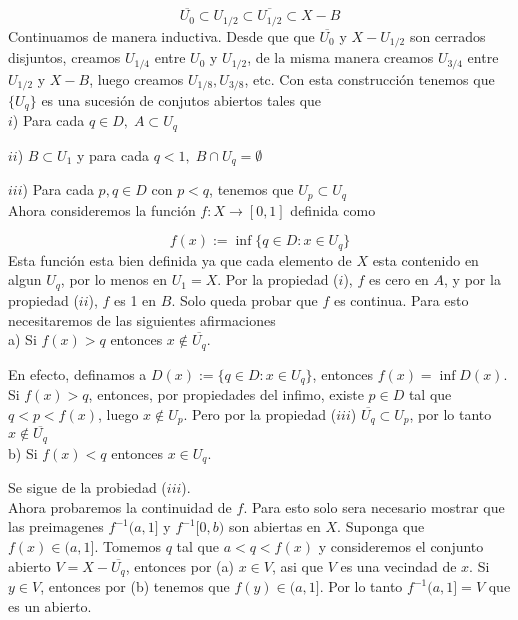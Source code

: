 \documentclass[12pt]{article}
\begin{document}
    \[\overline{U_0} \subset U_{1/2} \subset \overline{U_{1/2}} \subset X-B\]
    Continuamos de manera inductiva. Desde que que $\overline{U_0}$ y $X-U_{1/2}$ son 
    cerrados disjuntos, creamos $U_{1/4}$ entre $U_0$ y $U_{1/2}$, de la misma manera 
    creamos $U_{3/4}$ entre $U_{1/2}$ y $X-B$, luego creamos $U_{1/8}, U_{3/8}$, etc.
    Con esta construcci\'on tenemos que $\{U_q\}$ es una sucesi\'on de conjutos abiertos 
    tales que 
    \\

    $i$) \hspace*{4pt} Para cada $q\in D,\; A\subset U_q$

    $ii$) \hspace*{1pt} $B\subset U_1$ y para cada $q < 1,\; B\cap U_q = \emptyset$

    $iii$) Para cada $p,q\in D$ con $p < q$, tenemos que $U_p \subset U_q$
    \\

    Ahora consideremos la funci\'on $f:X\rightarrow [0,1]$ definida como

    \[f(x) := \inf\{q\in D : x\in U_q\}\]
    Esta funci\'on esta bien definida ya que cada elemento de $X$ esta contenido en algun 
    $U_q$, por lo menos en $U_1 = X$. Por la propiedad ($i$), $f$ es cero en $A$, y por 
    la propiedad ($ii$), $f$ es 1 en $B$. Solo queda probar que $f$ es continua. Para esto
    necesitaremos de las siguientes afirmaciones
    \\

    a) Si $f(x) > q$ entonces $x \notin \overline{U_q}$.
    
    \hspace*{8pt} En efecto, definamos a $D(x) := \{q\in D : x\in U_q\}$, entonces $f(x) = \inf D(x)$.
    Si \hspace*{26pt} $f(x) > q$, entonces, por propiedades del infimo, existe $p\in D$ tal que 
    $q < p < f(x)$, \hspace*{27pt} luego $x\notin U_p$. Pero por la propiedad ($iii$) 
    $\overline{U_q}\subset U_p$, por lo tanto $x\notin \overline{U_q}$
    \\

    b) Si $f(x) < q$ entonces $x\in U_q$.

    \hspace*{10pt} Se sigue de la probiedad ($iii$).
    \\

    Ahora probaremos la continuidad de $f$. Para esto solo sera necesario mostrar que las 
    preimagenes $f^{-1}(a,1]$ y $f^{-1}[0,b)$ son abiertas en $X$. Suponga que 
    $f(x)\in (a,1]$. Tomemos $q$ tal que $a < q < f(x)$ y consideremos el conjunto abierto
    $V = X-\overline{U_q}$, entonces por (a) $x\in V$, asi que $V$ es una vecindad de $x$.
    Si $y\in V$, entonces por (b) tenemos que $f(y)\in (a,1]$. Por lo tanto 
    $f^{-1}(a,1] = V$ que es un abierto.
    
\end{document}
